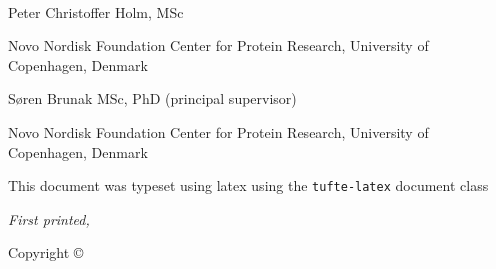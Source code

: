 \begin{@empty}
~\vfill
\thispagestyle{empty}
\setlength{\parindent}{0pt}
\setlength{\parskip}{\baselineskip}


Peter Christoffer Holm, MSc

Novo Nordisk Foundation Center for Protein Research,
University of Copenhagen, Denmark


Søren Brunak MSc, PhD (principal supervisor)

Novo Nordisk Foundation Center for Protein Research,
University of Copenhagen, Denmark


\par{}

\par This document was typeset using latex
using the \texttt{tufte-latex} document class

\par\textit{First printed, \monthyear}

Copyright \copyright\ \the\year\ \thanklessauthor
\end{@empty}
